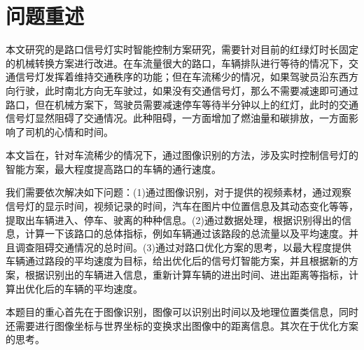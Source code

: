 \section{问题重述}\label{sec:peoblem_restatement}

本文研究的是路口信号灯实时智能控制方案研究，需要针对目前的红绿灯时长固定的机械转换方案进行改进。在车流量很大的路口，车辆排队进行等待的情况下，交通信号灯发挥着维持交通秩序的功能；但在车流稀少的情况，如果驾驶员沿东西方向行驶，此时南北方向无车驶过，如果没有交通信号灯，那么不需要减速即可通过路口，但在机械方案下，驾驶员需要减速停车等待半分钟以上的红灯，此时的交通信号灯显然阻碍了交通情况。此种阻碍，一方面增加了燃油量和碳排放，一方面影响了司机的心情和时间。

本文旨在，针对车流稀少的情况下，通过图像识别的方法，涉及实时控制信号灯的智能方案，最大程度提高路口的车辆的通行速度。

我们需要依次解决如下问题：(1)通过图像识别，对于提供的视频素材，通过观察信号灯的显示时间，视频记录的时间，汽车在图片中位置信息及其动态变化等等，提取出车辆进入、停车、驶离的种种信息。(2)通过数据处理，根据识别得出的信息，计算一下该路口的总体指标，例如车辆通过该路段的总流量以及平均速度。并且调查阻碍交通情况的总时间。(3)通过对路口优化方案的思考，以最大程度提供车辆通过路段的平均速度为目标，给出优化后的信号灯智能方案，并且根据新的方案，根据识别出的车辆进入信息，重新计算车辆的进出时间、进出距离等指标，计算出优化后的车辆的平均速度。

本题目的重心首先在于图像识别，图像可以识别出时间以及地理位置类信息，同时还需要进行图像坐标与世界坐标的变换求出图像中的距离信息。其次在于优化方案的思考。
